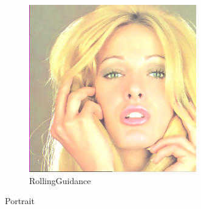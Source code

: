 \documentclass[12pt]{article}
\begin{document}
\begin{figure}
		\begin{subfigure}{0.4\textwidth}
			\centering
			\includegraphics[width=0.8\textwidth]{tiffany/tiffanytiffRollingGuidanceFilter.png}
			\caption{RollingGuidance}
		\end{subfigure}
		\caption{Portrait}
	\end{figure}
\end{document}
